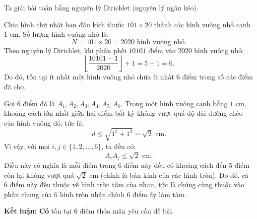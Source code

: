 \begin{loi_giai_cau}
Ta giải bài toán bằng nguyên lý Dirichlet (nguyên lý ngăn kéo).

Chia hình chữ nhật ban đầu kích thước $101 \times 20$ thành các hình vuông nhỏ cạnh $1\text{ cm}$.
Số lượng hình vuông nhỏ là:
\[N = 101 \times 20 = 2020\text{ hình vuông nhỏ}.\]
Theo nguyên lý Dirichlet, khi phân phối $10101$ điểm vào $2020$ hình vuông nhỏ:
\[\left\lfloor \frac{10101 - 1}{2020} \right\rfloor + 1 = 5 + 1 = 6.\]
Do đó, tồn tại ít nhất một hình vuông nhỏ chứa ít nhất $6$ điểm trong số các điểm đã cho.

Gọi $6$ điểm đó là $A_1, A_2, A_3, A_4, A_5, A_6$.
Trong một hình vuông cạnh bằng $1\text{ cm}$, khoảng cách lớn nhất giữa hai điểm bất kỳ không vượt quá độ dài đường chéo của hình vuông đó, tức là:
\[d \le \sqrt{1^2 + 1^2} = \sqrt{2}\text{ cm}.\]
Vì vậy, với mọi $i, j \in \{1, 2, \dots, 6\}$, ta đều có:
\[A_i A_j \le \sqrt{2}\text{ cm}.\]
Điều này có nghĩa là mỗi điểm trong 6 điểm này đều có khoảng cách đến 5 điểm còn lại không vượt quá $\sqrt{2}\text{ cm}$ (chính là bán kính của các hình tròn).
Do đó, cả 6 điểm này đều thuộc về hình tròn tâm của nhau, tức là chúng cùng thuộc vào phần chung của 6 hình tròn nhận chính 6 điểm ấy làm tâm.

\textbf{Kết luận:} \textbf{Có} tồn tại 6 điểm thỏa mãn yêu cầu đề bài.
\end{loi_giai_cau}
